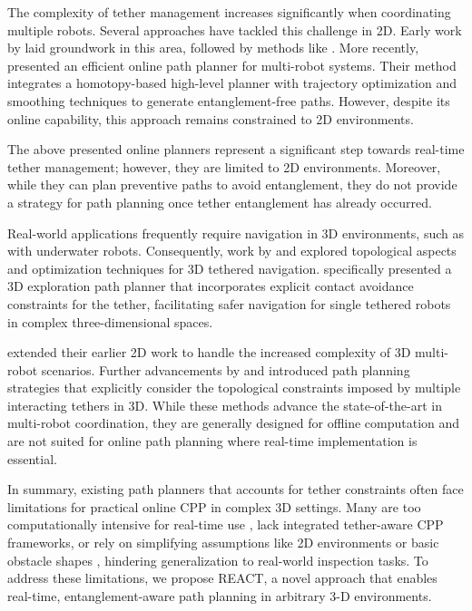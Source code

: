 The complexity of tether management increases significantly when coordinating multiple robots. Several approaches have tackled this challenge in 2D. Early work by \cite{hert1996ties} laid groundwork in this area, followed by methods like \cite{zhang2019planning}. More recently, \cite{cao2023neptune} presented an efficient online path planner for multi-robot systems. Their method integrates a homotopy-based high-level planner with trajectory optimization and smoothing techniques to generate entanglement-free paths. However, despite its online capability, this approach remains constrained to 2D environments. 

The above presented online planners represent a significant step towards real-time tether management; however, they are limited to 2D environments. Moreover, while they can plan preventive paths to avoid entanglement, they do not provide a strategy for path planning once tether entanglement has already occurred.

Real-world applications frequently require navigation in 3D environments, such as with underwater robots. Consequently, work by  \cite{bhattacharya2012topological} and \cite{martinez2021optimization} explored topological aspects and optimization techniques for 3D tethered navigation. \cite{petit2022tape} specifically presented a 3D exploration path planner that incorporates explicit contact avoidance constraints for the tether, facilitating safer navigation for single tethered robots in complex three-dimensional spaces.

 \cite{hert1999motion} extended their earlier 2D work to handle the increased complexity of 3D multi-robot scenarios. Further advancements by \cite{patil2023coordinating} and  \cite{cao2023path} introduced path planning strategies that explicitly consider the topological constraints imposed by multiple interacting tethers in 3D. While these methods advance the state-of-the-art in multi-robot coordination, they are generally designed for offline computation and are not suited for online path planning where real-time implementation is essential.

In summary, existing path planners that accounts for tether constraints often face limitations for practical online \ac{CPP} in complex 3D settings. Many are too computationally intensive for real-time use \cite{mechsy2017novel, hert1999motion, patil2023coordinating, cao2023path}, lack integrated tether-aware CPP frameworks, or rely on simplifying assumptions like 2D environments or basic obstacle shapes \cite{kim, withy, cao2023neptune}, hindering generalization to real-world inspection tasks.
To address these limitations, we propose \ac{REACT}, a novel approach that enables real-time, entanglement-aware path planning in arbitrary 3-D environments.


